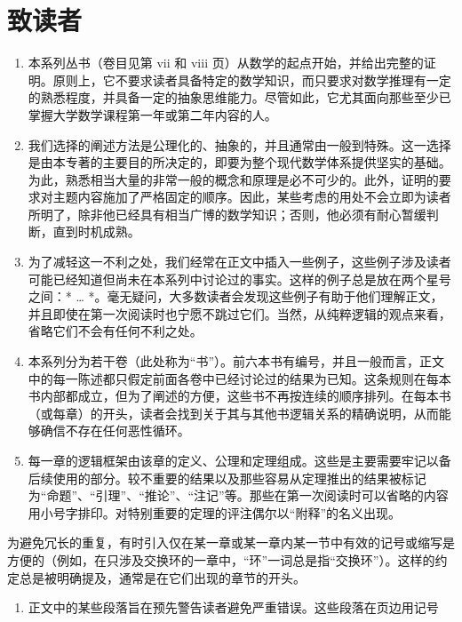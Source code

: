 \chapter*{致读者}
{}

\begin{enumerate}
\def\labelenumi{\arabic{enumi}.}
\item
  本系列丛书（卷目见第 vii 和 viii 页）从数学的起点开始，并给出完整的证明。原则上，它不要求读者具备特定的数学知识，而只要求对数学推理有一定的熟悉程度，并具备一定的抽象思维能力。尽管如此，它尤其面向那些至少已掌握大学数学课程第一年或第二年内容的人。
\item
  我们选择的阐述方法是公理化的、抽象的，并且通常由一般到特殊。这一选择是由本专著的主要目的所决定的，即要为整个现代数学体系提供坚实的基础。为此，熟悉相当大量的非常一般的概念和原理是必不可少的。此外，证明的要求对主题内容施加了严格固定的顺序。因此，某些考虑的用处不会立即为读者所明了，除非他已经具有相当广博的数学知识；否则，他必须有耐心暂缓判断，直到时机成熟。
\item
  为了减轻这一不利之处，我们经常在正文中插入一些例子，这些例子涉及读者可能已经知道但尚未在本系列中讨论过的事实。这样的例子总是放在两个星号之间：* \ldots{} *。毫无疑问，大多数读者会发现这些例子有助于他们理解正文，并且即使在第一次阅读时也宁愿不跳过它们。当然，从纯粹逻辑的观点来看，省略它们不会有任何不利之处。
\item
  本系列分为若干卷（此处称为“书”）。前六本书有编号，并且一般而言，正文中的每一陈述都只假定前面各卷中已经讨论过的结果为已知。这条规则在每本书内部都成立，但为了阐述的方便，这些书不再按连续的顺序排列。在每本书（或每章）的开头，读者会找到关于其与其他书逻辑关系的精确说明，从而能够确信不存在任何恶性循环。
\item
  每一章的逻辑框架由该章的定义、公理和定理组成。这些是主要需要牢记以备后续使用的部分。较不重要的结果以及那些容易从定理推出的结果被标记为“命题”、“引理”、“推论”、“注记”等。那些在第一次阅读时可以省略的内容用小号字排印。对特别重要的定理的评注偶尔以“附释”的名义出现。
\end{enumerate}

为避免冗长的重复，有时引入仅在某一章或某一章内某一节中有效的记号或缩写是方便的（例如，在只涉及交换环的一章中，“环”一词总是指“交换环”）。这样的约定总是被明确提及，通常是在它们出现的章节的开头。

\begin{enumerate}
\def\labelenumi{\arabic{enumi}.}
\setcounter{enumi}{5}
\tightlist
\item
  正文中的某些段落旨在预先警告读者避免严重错误。这些段落在页边用记号
\end{enumerate}

